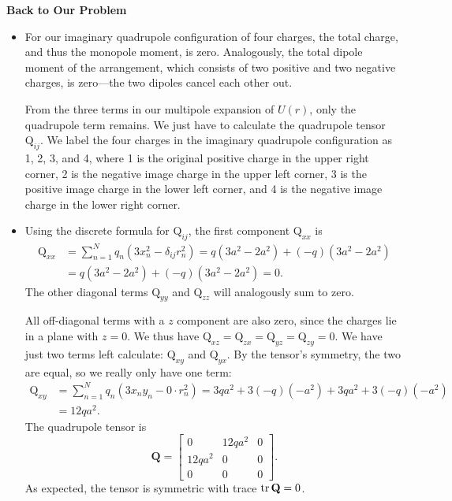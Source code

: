 \documentclass[11pt, a4paper]{article}
\newcommand{\mat}[1]{\mathbf{#1}} %
\begin{document}
\textbf{Back to Our Problem}
\begin{itemize}
	\item For our imaginary quadrupole configuration of four charges, the total charge, and thus the monopole moment, is zero. Analogously, the total dipole moment of the arrangement, which consists of two positive and two negative charges, is zero---the two dipoles cancel each other out. 
	
	From the three terms in our multipole expansion of $ U(r) $, only the quadrupole term remains. We just have to calculate the quadrupole tensor $ \mathrm{Q}_{ij} $. We label the four charges in the imaginary quadrupole configuration as 1, 2, 3, and 4, where 1 is the original positive charge in the upper right corner, 2 is the negative image charge in the upper left corner, 3 is the positive image charge in the lower left corner, and 4 is the negative image charge in the lower right corner. 
	
	\item Using the discrete formula for $ \mathrm{Q}_{ij} $, the first component $ \mathrm{Q}_{xx} $ is 
	\begin{align*}
		\mathrm{Q}_{xx} &= \sum_{n=1}^{N} q_{n} \left(3x_{n}^{2} - \delta_{ij}r_{n}^{2}\right) = q\left(3a^{2} - 2a^{2}\right) +  (-q)\left(3a^{2} - 2a^{2}\right)\\
		&= q\left(3a^{2} - 2a^{2}\right) +  (-q)\left(3a^{2} - 2a^{2}\right) = 0.
	\end{align*}
	The other diagonal terms $ \mathrm{Q}_{yy} $ and $ \mathrm{Q}_{zz} $ will analogously sum to zero.
	
	All off-diagonal terms with a $ z $ component are also zero, since the charges lie in a plane with $ z = 0 $. We thus have
	$ \mathrm{Q}_{xz} = \mathrm{Q}_{zx} = \mathrm{Q}_{yz} = \mathrm{Q}_{zy} = 0$. We have just two terms left calculate: $ \mathrm{Q}_{xy} $  and $ \mathrm{Q}_{yx} $. By the tensor's symmetry, the two are equal, so we really only have one term:
	\begin{align*}
		\mathrm{Q}_{xy} &= \sum_{n=1}^{N} q_{n} \left(3x_{n}y_{n} - 0\cdot r_{n}^{2}\right) = 3qa^{2} + 3(-q)(-a^{2}) + 3qa^{2} + 3(-q)(-a^{2})\\
		 &= 12qa^{2}.
	\end{align*}
	The quadrupole tensor is
	\begin{equation*}
		\mat{Q} =
		\begin{bmatrix}
			0 & 12q a^{2} & 0\\
			12q a^{2} & 0 & 0\\
			0 & 0 & 0
		\end{bmatrix}.
	\end{equation*}
	As expected, the tensor is symmetric with trace $ \tr \mat{Q} = 0 $. 
	

\end{itemize}
\end{document}
